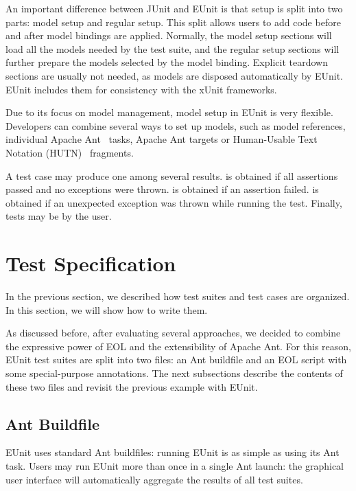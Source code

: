 An important difference between JUnit and EUnit is that setup is split into two parts: model setup and regular setup. This split allows users to add code before and after model bindings are applied. Normally, the model setup sections will load all the models needed by the test suite, and the regular setup sections will further prepare the models selected by the model binding. Explicit teardown sections are usually not needed, as models are disposed automatically by EUnit. EUnit includes them for consistency with the xUnit frameworks.

Due to its focus on model management, model setup in EUnit is very flexible. Developers can combine several ways to set up models, such as model references, individual Apache Ant~\cite{ANT} tasks, Apache Ant targets or Human-Usable Text Notation (HUTN)~\cite{HUTN} fragments.

A test case may produce one among several results.  is obtained if all assertions passed and no exceptions were thrown.  is obtained if an assertion failed.  is obtained if an unexpected exception was thrown while running the test. Finally, tests may be  by the user.

\section{Test Specification}
\label{sec:eunit-test-specification}

In the previous section, we described how test suites and test cases are organized. In this section, we will show how to write them.

As discussed before, after evaluating several approaches, we decided to combine the expressive power of EOL and the extensibility of Apache Ant. For this reason, EUnit test suites are split into two files: an Ant buildfile and an EOL script with some special-purpose annotations. The next subsections describe the contents of these two files and revisit the previous example with EUnit.

\subsection{Ant Buildfile}

EUnit uses standard Ant buildfiles: running EUnit is as simple as using its Ant task. Users may run EUnit more than once in a single Ant launch: the graphical user interface will automatically aggregate the results of all test suites.

